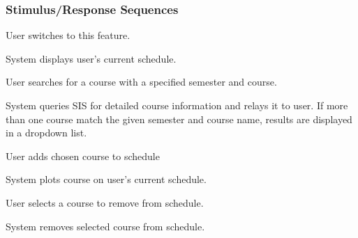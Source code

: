 \documentclass[pdftex,12pt,letter]{article}
\begin{document}
\subsubsection{Stimulus/Response Sequences}
\begin{description}\itemsep1pt
\item[Stimulus:] User switches to this feature.
\item[Response:] System displays user's current schedule.
\item[Stimulus:] User searches for a course with a specified semester and course.
\item[Response:] System queries SIS for detailed course information and relays it to user. If more than one course match the given semester and course name, results are displayed in a dropdown list.
\item[Stimulus:] User adds chosen course to schedule
\item[Response:] System plots course on user's current schedule.
\item[Stimulus:] User selects a course to remove from schedule.
\item[Response:] System removes selected course from schedule.
\end{description}
\end{document}

